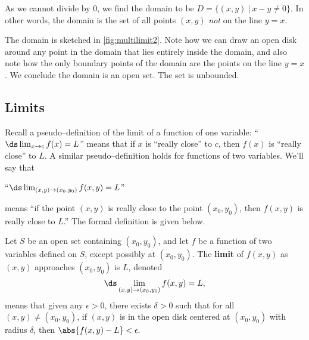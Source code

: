 {As we cannot divide by 0, we find the domain to be $D = \{(x,y)\ |\ x-y\neq 0\}$. In other words, the domain is the set of all points $(x,y)$ \emph{not} on the line $y=x$. 


The domain is sketched in \autoref{fig:multilimit2}. Note how we can draw an open disk around any point in the domain that lies entirely inside the domain, and also note how the only boundary points of the domain are the points on the line $y=x$. We conclude the domain is an open set. The set is unbounded.}

\subsection{Limits}

Recall a pseudo--definition of the limit of a function of one variable: ``$\ds \lim_{x\to c}f(x) = L$'' means that if $x$ is ``really close'' to $c$, then $f(x)$ is ``really close'' to $L$. A similar pseudo--definition holds for functions of two variables. We'll say that 

\begin{center}
``$\ds \lim_{(x,y)\to (x_0,y_0)} f(x,y) = L$''
\end{center}
means ``if the point $(x,y)$ is really close to the point $(x_0,y_0)$, then $f(x,y)$ is really close to $L$.'' The formal definition is given below.

{Let $S$ be an open set containing $(x_0,y_0)$, and let $f$ be a function of two variables defined on $S$, except possibly at $(x_0,y_0)$. 
The \textbf{limit} of $f(x,y)$ as $(x,y)$ approaches $(x_0,y_0)$ is $L$, denoted
\[\ds \lim_{(x,y)\to (x_0,y_0)} f(x,y) = L,\]
means that given any $\epsilon>0$, there exists $\delta>0$ such that for all  $(x,y)\neq (x_0,y_0)$, if $(x,y)$ is in the open disk centered at $(x_0,y_0)$ with radius $\delta$, then $\abs{f(x,y)-L}<\epsilon.$
}

